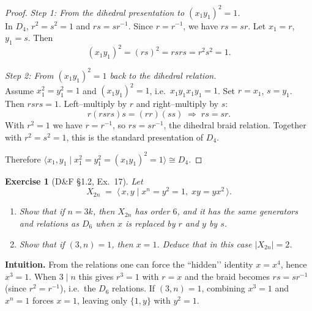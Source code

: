 \documentclass[12pt]{article}
\newtheorem{exercise}[theorem]{Exercise}
\theoremstyle{definition}
\begin{document}
\begin{proof}
\noindent\emph{Step 1: From the dihedral presentation to $(x_1y_1)^2=1$.}\\

\noindent
In $D_{4}$, $r^{2}=s^{2}=1$ and $rs=sr^{-1}$. Since $r=r^{-1}$, we have $rs=sr$. Let $x_1=r$, $y_1=s$.
Then
\[
(x_1y_1)^2=(rs)^2=rsrs=r^{2}s^{2}=1.
\]

\dotfill

\noindent\emph{Step 2: From $(x_1y_1)^2=1$ back to the dihedral relation.}\\

\noindent
Assume $x_1^{2}=y_1^{2}=1$ and $(x_1y_1)^2=1$, i.e.\ $x_1y_1x_1y_1=1$. Set $r=x_1$, $s=y_1$.
Then $rsrs=1$. Left–multiply by $r$ and right–multiply by $s$:
\[
r(rsrs)s=(rr)(ss)\;\Rightarrow\; rs=sr.
\]
With $r^{2}=1$ we have $r=r^{-1}$, so $rs=sr^{-1}$, the dihedral braid relation. Together with
$r^{2}=s^{2}=1$, this is the standard presentation of $D_{4}$.

\dotfill

Therefore $\langle x_1,y_1\mid x_1^{2}=y_1^{2}=(x_1y_1)^{2}=1\rangle \cong D_{4}$.
\end{proof}

\newpage

\begin{exercise}[D\&F §1.2, Ex.~17]
Let
\[
X_{2n}\;=\;\langle\,x,y\mid x^{n}=y^{2}=1,\; xy=yx^{2}\,\rangle.
\]
\begin{enumerate}
\item[(a)] Show that if $n=3k$, then $X_{2n}$ has order $6$, and it has the same generators and relations as $D_{6}$ when $x$ is replaced by $r$ and $y$ by $s$.
\item[(b)] Show that if $(3,n)=1$, then $x=1$. Deduce that in this case $|X_{2n}|=2$.
\end{enumerate}
\end{exercise}

\dotfill

\noindent
\textbf{Intuition.}
From the relations one can force the “hidden’’ identity $x=x^{4}$, hence $x^{3}=1$. When $3\mid n$ this gives
$r^{3}=1$ with $r=x$ and the braid becomes $rs=sr^{-1}$ (since $r^{2}=r^{-1}$), i.e.\ the $D_{6}$ relations.
If $(3,n)=1$, combining $x^{3}=1$ and $x^{n}=1$ forces $x=1$, leaving only $\{1,y\}$ with $y^{2}=1$.

\dotfill
\end{document}
